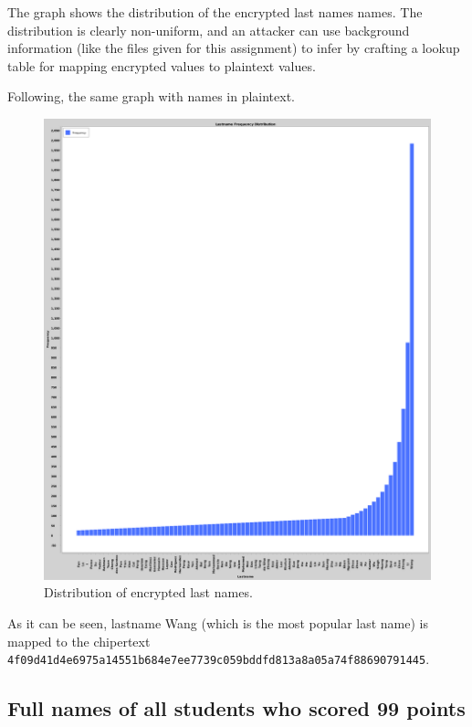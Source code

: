 The graph shows the distribution of the encrypted last names names. The distribution is clearly non-uniform, and an attacker can use background information (like the files given for this assignment) to infer by crafting a lookup table for mapping encrypted values to plaintext values.

Following, the same graph with names in plaintext.

\begin{figure}[h!]
    \centering
    \includegraphics[width=\textwidth]{03-ex2/Lastname_Frequency_Distribution_Plain.png}
    \caption{Distribution of encrypted last names.}
    \label{fig:Distribution-of-last-names-plain}
\end{figure}

As it can be seen, lastname Wang (which is the most popular last name) is mapped to the chipertext \\ \texttt{4f09d41d4e6975a14551b684e7ee7739c059bddfd813a8a05a74f88690791445}.

\subsection{Full names of all students who scored 99 points}

